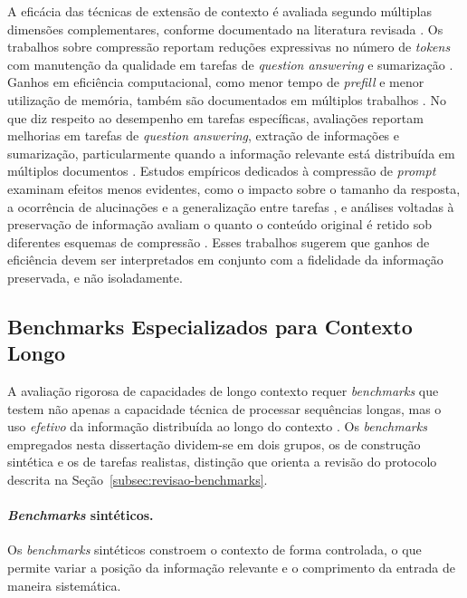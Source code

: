 A eficácia das técnicas de extensão de contexto é avaliada segundo múltiplas dimensões complementares, conforme documentado na literatura revisada \cite{choi2025loraragg,bai2023longbench,hsieh2024ruler}. Os trabalhos sobre compressão reportam reduções expressivas no número de \textit{tokens} com manutenção da qualidade em tarefas de \textit{question answering} e sumarização \cite{jiang2023llmlingua,gilbert2023semanticcompression}. Ganhos em eficiência computacional, como menor tempo de \textit{prefill} e menor utilização de memória, também são documentados em múltiplos trabalhos \cite{miao2024serving}. No que diz respeito ao desempenho em tarefas específicas, avaliações reportam melhorias em tarefas de \textit{question answering}, extração de informações e sumarização, particularmente quando a informação relevante está distribuída em múltiplos documentos \cite{bai2023longbench,choi2025loraragg}. Estudos empíricos dedicados à compressão de \textit{prompt} examinam efeitos menos evidentes, como o impacto sobre o tamanho da resposta, a ocorrência de alucinações e a generalização entre tarefas \cite{zhang2025empirical}, e análises voltadas à preservação de informação avaliam o quanto o conteúdo original é retido sob diferentes esquemas de compressão \cite{lajewska2025understanding}. Esses trabalhos sugerem que ganhos de eficiência devem ser interpretados em conjunto com a fidelidade da informação preservada, e não isoladamente.

\subsection{Benchmarks Especializados para Contexto Longo}
\label{subsec:benchmarks}

A avaliação rigorosa de capacidades de longo contexto requer \textit{benchmarks} que testem não apenas a capacidade técnica de processar sequências longas, mas o uso \textit{efetivo} da informação distribuída ao longo do contexto \cite{bai2023longbench,hsieh2024ruler}. Os \textit{benchmarks} empregados nesta dissertação dividem-se em dois grupos, os de construção sintética e os de tarefas realistas, distinção que orienta a revisão do protocolo descrita na Seção~\ref{subsec:revisao-benchmarks}.

\paragraph{\textit{Benchmarks} sintéticos.}
Os \textit{benchmarks} sintéticos constroem o contexto de forma controlada, o que permite variar a posição da informação relevante e o comprimento da entrada de maneira sistemática.


